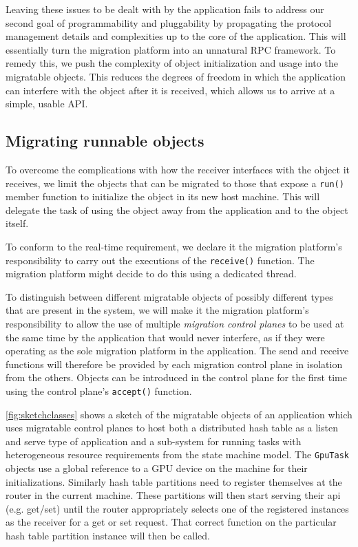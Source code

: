 Leaving these issues to be dealt with by the application
fails to address our second goal of programmability and pluggability
by propagating the protocol management details and complexities up to the
core of the application. This will essentially turn the migration
platform into an unnatural RPC framework. To remedy this, we push the
complexity of object initialization and usage into the migratable
objects. This reduces the degrees of freedom in which the application
can interfere with the object after it is received, which allows us to
arrive at a simple, usable API.

\subsection{Migrating runnable objects}
To overcome the complications with how the receiver interfaces with the
object it receives, we limit the objects that can be migrated to those
that expose a \texttt{run()} member function to
initialize the object in its new host machine. This will delegate the task
of using the object away from the application and to the object itself.

To conform to the real-time requirement, we declare it the migration
platform's responsibility to carry out the executions of the
\texttt{receive()} function. The migration platform might decide to do
this using a dedicated thread.

To distinguish between different migratable objects of possibly different
types that are present in the system, we will make it the migration
platform's responsibility to allow the use of multiple
\emph{migration control planes} to be used at the same time by the
application that would never interfere, as if they were operating
as the sole migration platform in the application.
The send and receive functions
will therefore be provided by each migration control plane in isolation
from the others. Objects can be introduced in the control plane for the
first time using the control plane's \texttt{accept()} function.

\autoref{fig:sketchclasses} shows a sketch of the migratable objects of
an application which uses migratable control planes to
host both a distributed hash table as a listen and serve type of
application and a sub-system for running tasks with heterogeneous resource
requirements from the state machine model. The \texttt{GpuTask} objects
use a global reference to a GPU device on the machine for their
initializations. Similarly hash table partitions need to register
themselves at the router in the current machine. These partitions will
then start serving their api (e.g. get/set) until the router appropriately
selects one of the registered instances as the receiver for a get or set
request. That correct function on the particular hash table partition
instance will then be called.


